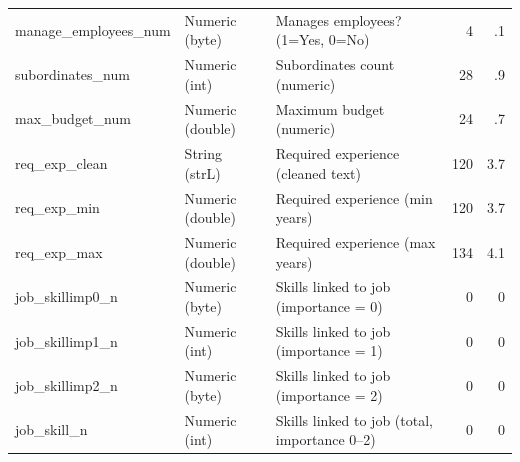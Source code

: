 \begin{threeparttable}
\begin{tabular}{@{}lllrr@{}}
manage\_employees\_num & Numeric (byte) & Manages employees? (1=Yes, 0=No)&           4&          .1\\
subordinates\_num & Numeric (int) & Subordinates count (numeric)&          28&          .9\\
max\_budget\_num & Numeric (double) & Maximum budget (numeric)&          24&          .7\\
req\_exp\_clean & String (strL) & Required experience (cleaned text)&         120&         3.7\\
req\_exp\_min & Numeric (double) & Required experience (min years)&         120&         3.7\\
req\_exp\_max & Numeric (double) & Required experience (max years)&         134&         4.1\\
job\_skillimp0\_n & Numeric (byte) & Skills linked to job (importance = 0)&           0&           0\\
job\_skillimp1\_n & Numeric (int) & Skills linked to job (importance = 1)&           0&           0\\
job\_skillimp2\_n & Numeric (byte) & Skills linked to job (importance = 2)&           0&           0\\
job\_skill\_n & Numeric (int) & Skills linked to job (total, importance 0–2)&           0&           0\\
\bottomrule


\end{tabular}


\end{threeparttable}
